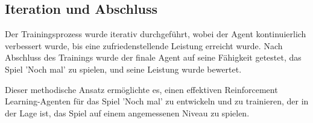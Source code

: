 \subsection{Iteration und Abschluss}

Der Trainingsprozess wurde iterativ durchgeführt, wobei der Agent kontinuierlich verbessert wurde, bis eine zufriedenstellende Leistung erreicht wurde. Nach Abschluss des Trainings wurde der finale Agent auf seine Fähigkeit getestet, das Spiel 'Noch mal' zu spielen, und seine Leistung wurde bewertet.

Dieser methodische Ansatz ermöglichte es, einen effektiven Reinforcement Learning-Agenten für das Spiel 'Noch mal' zu entwickeln und zu trainieren, der in der Lage ist, das Spiel auf einem angemessenen Niveau zu spielen.
